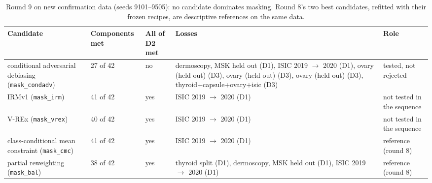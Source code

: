 \begin{table}[H]\centering\scriptsize
\caption{Round 9 on new confirmation data (seeds 9101--9505): no candidate dominates masking. Round 8's two best candidates, refitted with their frozen recipes, are descriptive references on the same data.}\label{tab:rNine}
\begin{tabular}{p{4.6cm}p{1.6cm}p{1.3cm}p{5.2cm}p{2.4cm}}\toprule
Candidate & Components met & All of D2 met & Losses & Role \\\midrule
conditional adversarial debiasing (\texttt{mask\_condadv}) & 27 of 42 & no & dermoscopy, MSK held out (D1), ISIC 2019 $\to$ 2020 (D1), ovary (held out) (D3), ovary (held out) (D3), ovary (held out) (D3), thyroid+capsule+ovary+isic (D3) & tested, not rejected \\
IRMv1 (\texttt{mask\_irm}) & 41 of 42 & yes & ISIC 2019 $\to$ 2020 (D1) & not tested in the sequence \\
V-REx (\texttt{mask\_vrex}) & 40 of 42 & yes & ISIC 2019 $\to$ 2020 (D1) & not tested in the sequence \\
class-conditional mean constraint (\texttt{mask\_cmc}) & 41 of 42 & yes & ISIC 2019 $\to$ 2020 (D1) & reference (round 8) \\
partial reweighting (\texttt{mask\_bal}) & 38 of 42 & yes & thyroid split (D1), dermoscopy, MSK held out (D1), ISIC 2019 $\to$ 2020 (D1) & reference (round 8) \\
\bottomrule\end{tabular}
\end{table}
